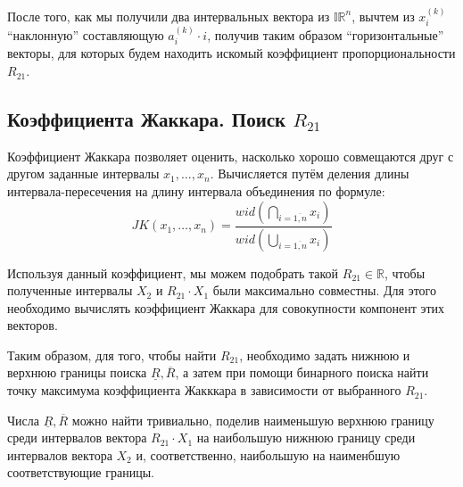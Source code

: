 После того, как мы получили два интервальных вектора из $\mathbb{IR}^n$, вычтем из $x_i^{(k)}$ ``наклонную'' составляющую $a_i^{(k)} \cdot i$, получив таким образом ``горизонтальные'' векторы, для которых будем находить искомый коэффициент пропорциональности $R_{21}$.

\subsection{Коэффициента Жаккара. Поиск $R_{21}$}
Коэффициент Жаккара позволяет оценить, насколько хорошо совмещаются друг с другом заданные интервалы $x_1, \dots, x_n$. Вычисляется путём деления длины интервала-пересечения на длину интервала объединения по формуле:
\begin{equation}
JK(x_1, \dots, x_n) = \frac{wid \left( \underset{i=\overline{1,n}}\bigcap x_i \right)}{wid \left(\underset{i=\overline{1,n}}\bigcup x_i\right)}
\end{equation}

Используя данный коэффициент, мы можем подобрать такой $R_{21} \in \mathbb{R}$, чтобы полученные интервалы $X_2$ и $R_{21} \cdot X_1$ были максимально совместны. Для этого необходимо вычислять коэффициент Жаккара для совокупности компонент этих векторов.

Таким образом, для того, чтобы найти $R_{21}$, необходимо задать нижнюю и верхнюю границы поиска $\underline{R}, \overline{R}$, а затем при помощи бинарного поиска найти точку максимума коэффициента Жакккара в зависимости от выбранного $R_{21}$.

Числа $\underline{R}, \overline{R}$ можно найти тривиально, поделив наименьшую верхнюю границу среди интервалов вектора $R_{21} \cdot X_1$ на наибольшую нижнюю границу среди интервалов вектора $X_2$ и, соответственно, наибольшую на наименбшую соответствующие границы.